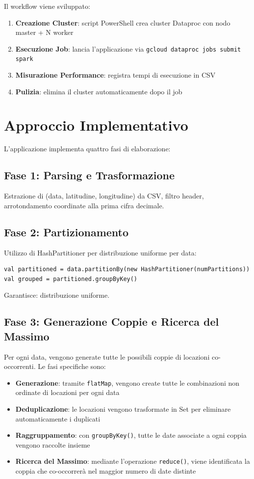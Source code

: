 \documentclass[8pt,a4paper]{article}
\begin{document}
Il workflow viene sviluppato:

\begin{enumerate}
    \item \textbf{Creazione Cluster}: script PowerShell crea cluster Dataproc con nodo master + N worker
    \item \textbf{Esecuzione Job}: lancia l'applicazione via \texttt{gcloud dataproc jobs submit spark}
    \item \textbf{Misurazione Performance}: registra tempi di esecuzione in CSV
    \item \textbf{Pulizia}: elimina il cluster automaticamente dopo il job
\end{enumerate}

\section{Approccio Implementativo}

L'applicazione implementa quattro fasi di elaborazione:

\subsection{Fase 1: Parsing e Trasformazione}
Estrazione di (data, latitudine, longitudine) da CSV, filtro header, arrotondamento coordinate alla prima cifra decimale.

\subsection{Fase 2: Partizionamento}
Utilizzo di HashPartitioner per distribuzione uniforme per data:
\begin{lstlisting}
val partitioned = data.partitionBy(new HashPartitioner(numPartitions))
val grouped = partitioned.groupByKey()
\end{lstlisting}

Garantisce: distribuzione uniforme.

\subsection{Fase 3: Generazione Coppie e Ricerca del Massimo}

Per ogni data, vengono generate tutte le possibili coppie di locazioni co-occorrenti. Le fasi specifiche sono:

\begin{itemize}
    \item \textbf{Generazione}: tramite \texttt{flatMap}, vengono create tutte le combinazioni non ordinate di locazioni per ogni data
    \item \textbf{Deduplicazione}: le locazioni vengono trasformate in Set per eliminare automaticamente i duplicati
    \item \textbf{Raggruppamento}: con \texttt{groupByKey()}, tutte le date associate a ogni coppia vengono raccolte insieme
    \item \textbf{Ricerca del Massimo}: mediante l'operazione \texttt{reduce()}, viene identificata la coppia che co-occorrerà nel maggior numero di date distinte
\end{itemize}
\end{document}
